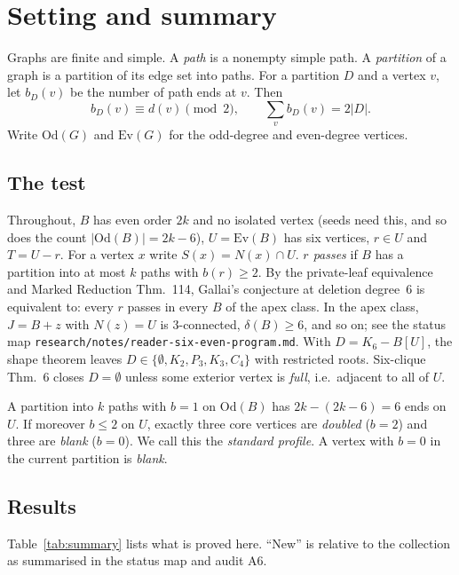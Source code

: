 \documentclass[11pt]{amsart}
\theoremstyle{definition}
\newcommand{\Ev}{\mathrm{Ev}}
\newcommand{\Od}{\mathrm{Od}}
\begin{document}
\section{Setting and summary}\label{sec:intro}

Graphs are finite and simple. A \emph{path} is a nonempty simple path. A \emph{partition} of a graph
is a partition of its edge set into paths. For a partition $D$ and a vertex $v$, let $b_D(v)$ be the
number of path ends at $v$. Then
\begin{equation}\label{eq:parity}
b_D(v)\equiv d(v)\pmod 2,\qquad \sum_v b_D(v)=2|D|.
\end{equation}
Write $\Od(G)$ and $\Ev(G)$ for the odd-degree and even-degree vertices.

\subsection*{The test} Throughout, $B$ has even order $2k$ and no isolated vertex (seeds need
this, and so does the count $|\Od(B)|=2k-6$), $U=\Ev(B)$ has six vertices, $r\in U$
and $T=U-r$. For a vertex $x$ write $S(x)=N(x)\cap U$. \emph{$r$ passes} if $B$ has a partition into at most $k$ paths with $b(r)\ge 2$. By
the private-leaf equivalence and Marked Reduction Thm.~114, Gallai's conjecture at deletion
degree~6 is equivalent to: every $r$ passes in every $B$ of the apex class. In the apex class,
$J=B+z$ with $N(z)=U$ is $3$-connected, $\delta(B)\ge 6$, and so on; see the status map
\texttt{research/notes/reader-six-even-program.md}. With $D=K_6-B[U]$, the shape theorem leaves
$D\in\{\emptyset,K_2,P_3,K_3,C_4\}$ with restricted roots. Six-clique Thm.~6 closes $D=\emptyset$
unless some exterior vertex is \emph{full}, i.e.\ adjacent to all of $U$.

A partition into $k$ paths with $b=1$ on $\Od(B)$ has $2k-(2k-6)=6$ ends on $U$. If moreover $b\le2$
on $U$, exactly three core vertices are \emph{doubled} ($b=2$) and three are \emph{blank} ($b=0$).
We call this the \emph{standard profile}. A vertex with $b=0$ in the current partition is
\emph{blank}.

\subsection*{Results} Table~\ref{tab:summary} lists what is proved here. ``New'' is relative to the
collection as summarised in the status map and audit A6.
\end{document}
